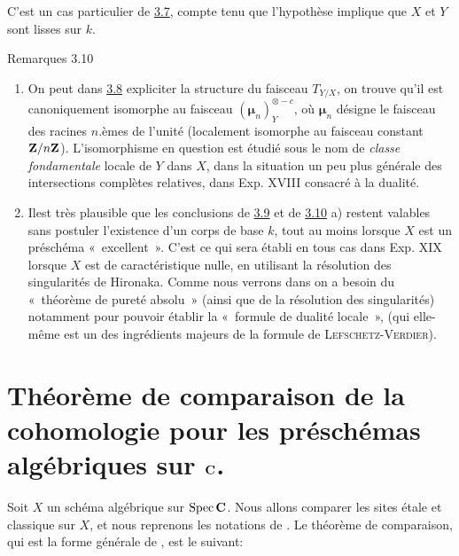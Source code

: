 \documentclass[10pt]{../fichiers-configuration-latex/smfart}
\begin{document}
C'est un cas particulier de \hyperref[XVI.thm3.7]{3.7}, compte tenu que l'hypothèse implique
que $X$ et $Y$ sont lisses sur $k$.

\begin{enonce*}[remark]{Remarques 3.10}
\begin{enumerate}
\renewcommand{\theenumi}{\alph{enumi}}
\renewcommand{\labelenumi}{\theenumi)}
\item On peut dans \hyperref[XVI.cor3.8]{3.8} expliciter la structure du faisceau $T_{Y/X}$,
on trouve qu'il est canoniquement isomorphe au faisceau
$(𝛍_n)_Y^{\otimes -c}$, où $𝛍_n$
désigne le faisceau des racines $n$.èmes de l'unité (localement
isomorphe au faisceau constant
$\mathbf{Z}/n\mathbf{Z}$). L'isomorphisme en question est étudié sous
le nom de \emph{classe fondamentale} locale de $Y$ dans $X$, dans la
situation un peu plus générale des intersections complètes relatives,
dans Exp. XVIII consacré à la dualité.

\item Il\pageoriginale est très plausible que les conclusions de
\hyperref[XVI.cor3.9]{3.9} et de \hyperref[XVI.rems3.10]{3.10} a) restent valables sans
postuler l'existence d'un corps de base $k$, tout au moins lorsque $X$
est un préschéma « excellent ». C'est ce qui sera établi en tous
cas dans Exp. XIX lorsque $X$ est de caractéristique nulle, en
utilisant la résolution des singularités de Hironaka. Comme nous
verrons dans  on a besoin du « théorème de pureté absolu »
(ainsi que de la résolution des singularités) notamment pour pouvoir
établir la « formule de dualité locale », (qui elle-même est un
des ingrédients majeurs de la formule de \textsc{Lefschetz-Verdier}).
\end{enumerate}
\end{enonce*}

\section{Théorème de comparaison de la cohomologie pour les préschémas
algébriques sur $\mathbf{C}$.}

Soit $X$ un schéma algébrique sur $\operatorname{Spec} \mathbf{C}$. Nous allons
comparer les sites étale et classique sur $X$, et nous reprenons les
notations de . Le théorème de comparaison, qui est la forme
générale de , est le suivant:
\end{document}
